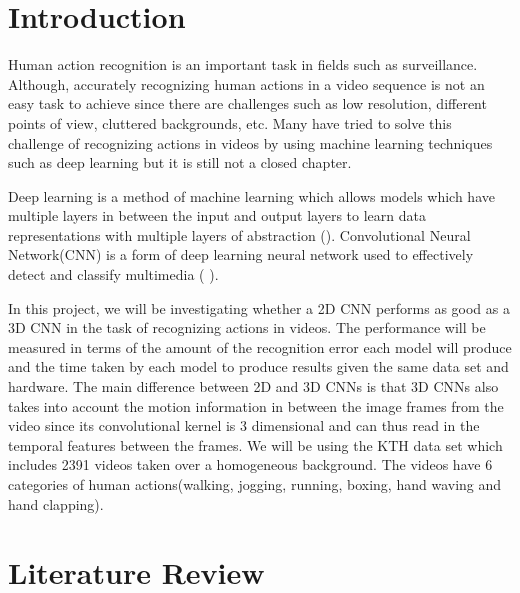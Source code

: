  


\maketitle
\newpage
\section{Introduction}
 \vspace{0.1in}
 \par
Human action recognition is an important task in fields such as surveillance. Although, accurately recognizing human  actions in a video sequence is not an easy task to achieve since there are challenges such as low resolution, different points of view, cluttered backgrounds, etc. Many have tried to solve this challenge of recognizing actions in videos by using machine learning techniques such as deep learning but it is still not a closed chapter. \vspace{0.1in}

Deep learning is a method of machine learning which allows models which have multiple layers in between the input and output layers to learn data representations with multiple layers of abstraction (\cite{lecun2015deep}). Convolutional Neural Network(CNN) is a form of deep learning neural network used to effectively detect and classify multimedia (\cite{lecun2015deep} ). \vspace{0.1in}

In this project, we will be investigating whether a 2D CNN performs as good as a 3D CNN in the task of recognizing actions in videos. The performance will be measured in terms of the amount of the recognition error each model will produce and the time taken by each model to produce results given the same data set and hardware. The main difference between 2D and 3D CNNs is that 3D CNNs also takes into account the motion information in between the image frames from the video since its convolutional kernel is 3 dimensional and can thus read in the temporal features between the frames. We will be using the KTH data set which includes 2391 videos taken over a homogeneous background. The videos have 6 categories of human actions(walking, jogging, running, boxing, hand waving and hand clapping).

 \par

\section{Literature Review}

